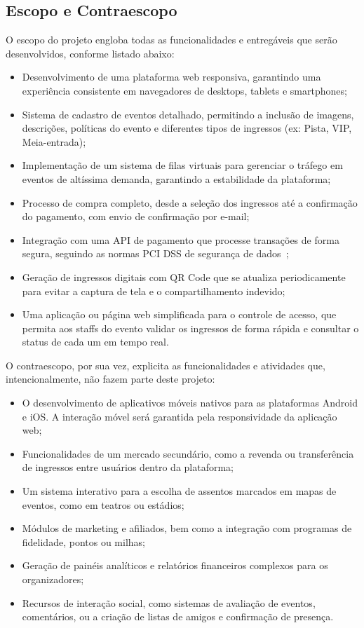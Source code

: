 \subsection{Escopo e Contraescopo}

O escopo do projeto engloba todas as funcionalidades e entregáveis que serão desenvolvidos, conforme listado abaixo:
\begin{itemize}
    \item Desenvolvimento de uma plataforma web responsiva, garantindo uma experiência consistente em navegadores de desktops, tablets e smartphones;
    \item Sistema de cadastro de eventos detalhado, permitindo a inclusão de imagens, descrições, políticas do evento e diferentes tipos de ingressos (ex: Pista, VIP, Meia-entrada);
    \item Implementação de um sistema de filas virtuais para gerenciar o tráfego em eventos de altíssima demanda, garantindo a estabilidade da plataforma;
    \item Processo de compra completo, desde a seleção dos ingressos até a confirmação do pagamento, com envio de confirmação por e-mail;
    \item Integração com uma API de pagamento que processe transações de forma segura, seguindo as normas PCI DSS de segurança de dados~\cite{PCIDSS:2022};
    \item Geração de ingressos digitais com QR Code que se atualiza periodicamente para evitar a captura de tela e o compartilhamento indevido;
    \item Uma aplicação ou página web simplificada para o controle de acesso, que permita aos staffs do evento validar os ingressos de forma rápida e consultar o status de cada um em tempo real.
\end{itemize}

O contraescopo, por sua vez, explicita as funcionalidades e atividades que, intencionalmente, não fazem parte deste projeto:
\begin{itemize}
    \item O desenvolvimento de aplicativos móveis nativos para as plataformas Android e iOS. A interação móvel será garantida pela responsividade da aplicação web;
    \item Funcionalidades de um mercado secundário, como a revenda ou transferência de ingressos entre usuários dentro da plataforma;
    \item Um sistema interativo para a escolha de assentos marcados em mapas de eventos, como em teatros ou estádios;
    \item Módulos de marketing e afiliados, bem como a integração com programas de fidelidade, pontos ou milhas;
    \item Geração de painéis analíticos e relatórios financeiros complexos para os organizadores;
    \item Recursos de interação social, como sistemas de avaliação de eventos, comentários, ou a criação de listas de amigos e confirmação de presença.
\end{itemize}
